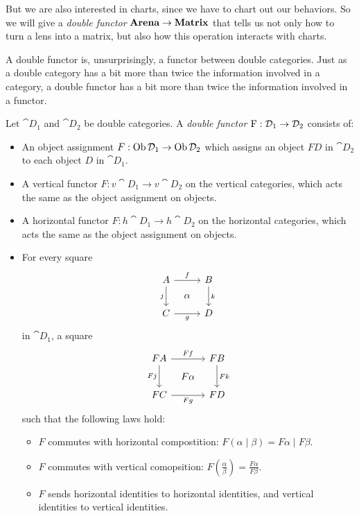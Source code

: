 \documentclass[DynamicalBook]{subfiles}
\begin{document}
 But we are also interested in charts, since we have to chart out our
behaviors. So we will give a \emph{double functor} $\textbf{Arena} \to
\textbf{Matrix}$ that tells us not only how to turn a lens into a matrix, but also
how this operation interacts with charts.

A double functor is, unsurprisingly, a functor between double categories. Just
as a double category has a bit more than twice the information involved in a
category, a double functor has a bit more than twice the information involved in
a functor.
\begin{definition}\label{def.double_functor}
 Let $\cat{D}_1$ and $\cat{D}_2$ be double categories. A \emph{double functor}
 $\mathrm{F} : \mathcal{D}_1 \to \mathcal{D}_2$ consists of:
\begin{itemize}
  \item An object assignment $F : \operatorname{Ob} \mathcal{D}_1 \to \operatorname{Ob} \mathcal{D}_2$ which assigns an object $F D$
    in $\cat{D}_2$ to each object $D$ in $\cat{D}_1$.
  \item A vertical functor $F : v\cat{D}_1 \to v\cat{D}_2$ on the vertical
    categories, which acts the same as the object assignment on objects.
  \item A horizontal functor $F : h\cat{D}_1 \to h\cat{D}_2$ on the horizontal
    categories, which acts the same as the object assignment on objects.
  \item For every square
    \[
        \begin{tikzcd}[sep=tiny]
          A \ar[dd, "j"'] \ar[rr, "f"] & & B \ar[dd, "k"] \\
           & \alpha & \\
          C \ar[rr, "g"'] & & D
        \end{tikzcd}
    \]
    in $\cat{D}_1$, a square
    \[
        \begin{tikzcd}[sep=tiny]
          FA \ar[dd, "Fj"'] \ar[rr, "Ff"] & & FB \ar[dd, "Fk"] \\
           & F\alpha & \\
          FC \ar[rr, "Fg"'] & & FD
        \end{tikzcd}
    \]
    such that the following laws hold:
    \begin{itemize}
    \item $F$ commutes with horizontal compostition: $F(\alpha \mid \beta) = F\alpha \mid F\beta$.
    \item $F$ commutes with vertical comopsition: $F\left( \frac{\alpha}{\beta} \right) = \frac{F\alpha}{F\beta}$.
    \item $F$ sends horizontal identities to horizontal identities, and vertical
      identities to vertical identities.
    \end{itemize}
\end{itemize}
\end{definition}
\end{document}
